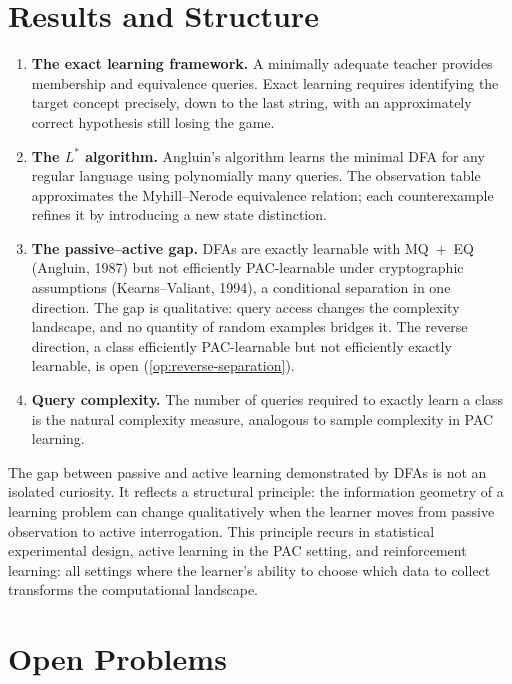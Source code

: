 \section{Results and Structure}
\label{sec:ch8-summary}

\begin{enumerate}[leftmargin=*, itemsep=3pt]
\item \textbf{The exact learning framework.} A minimally adequate teacher provides membership and equivalence queries. Exact learning requires identifying the target concept precisely, down to the last string, with an approximately correct hypothesis still losing the game.

\item \textbf{The $L^*$ algorithm.} Angluin's algorithm learns the minimal DFA for any regular language using polynomially many queries. The observation table approximates the Myhill--Nerode equivalence relation; each counterexample refines it by introducing a new state distinction.

\item \textbf{The passive--active gap.} DFAs are exactly learnable with MQ~+~EQ (Angluin, 1987) but not efficiently PAC-learnable under cryptographic assumptions (Kearns--Valiant, 1994), a conditional separation in one direction. The gap is qualitative: query access changes the complexity landscape, and no quantity of random examples bridges it. The reverse direction, a class efficiently PAC-learnable but not efficiently exactly learnable, is open (\cref{op:reverse-separation}).

\item \textbf{Query complexity.} The number of queries required to exactly learn a class is the natural complexity measure, analogous to sample complexity in PAC learning.
\end{enumerate}

The gap between passive and active learning demonstrated by DFAs is not an isolated curiosity. It reflects a structural principle: the information geometry of a learning problem can change qualitatively when the learner moves from passive observation to active interrogation. This principle recurs in statistical experimental design, active learning in the PAC setting, and reinforcement learning: all settings where the learner's ability to choose which data to collect transforms the computational landscape.

\section{Open Problems}
\label{sec:ch8-open}

